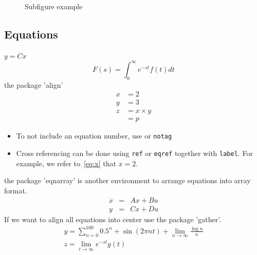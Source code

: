 \documentclass[11pt,a4paper]{article}
\begin{document}
\begin{figure}
\centering
{} 
\caption{Subfigure example}
\end{figure}

\subsection{Equations}
$y=Cx$
\begin{equation}
	F(s) = \int_0^\infty e^{-st} f(t) dt
\end{equation}
the package 'align'
\begin{align}
    x    &= 2 \label{eq:x} \\
    y    &= 3 \label{eq:y} \\
    z    &= x \times y \nonumber \\
        &= p \label{eq:results}
\end{align}
\begin{itemize}
\item To not include an equation number, use \texttt{\nonumber} or \texttt{notag} 
\item Cross referencing can be done using \texttt{ref} or \texttt{eqref} together with \texttt{label}. For example, we refer to~\eqref{eq:x} that $x=2$.
\end{itemize}
the package 'eqnarray' is another environment to arrange equations into array format.
\begin{eqnarray}
\dot{x} &=& Ax + Bu \\
y &=& Cx+Du
\end{eqnarray}
If we want to align all equations into center use the package 'gather'.
\begin{gather}
y = \sum_{n=0}^100 0.5^n + \sin(2\pi n t) + \lim_{n \rightarrow \infty} \frac{\log n}{n} \\
z = \lim_{t \rightarrow \infty} e^{-st} g(t) 
\end{gather}
\end{document}
